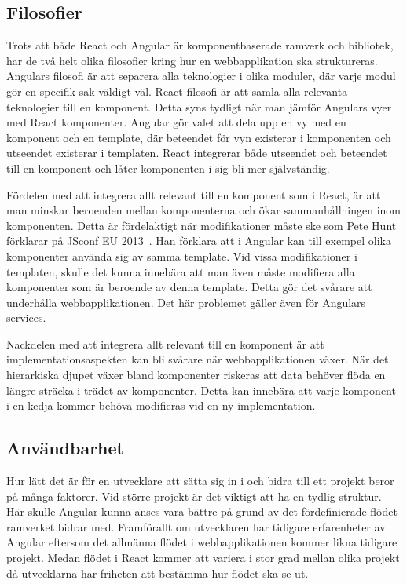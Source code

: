 \subsection{Filosofier}
Trots att både React och Angular är komponentbaserade ramverk och bibliotek, har de två helt olika filosofier kring hur en webbapplikation ska struktureras. Angulars filosofi är att separera alla teknologier i olika moduler, där varje modul gör en specifik sak väldigt väl. React filosofi är att samla alla relevanta teknologier till en komponent. Detta syns tydligt när man jämför Angulars vyer med React komponenter. Angular gör valet att dela upp en vy med en komponent och en template, där beteendet för vyn existerar i komponenten och utseendet existerar i templaten. React integrerar både utseendet och beteendet till en komponent och låter komponenten i sig bli mer självständig. 

Fördelen med att integrera allt relevant till en komponent som i React, är att man minskar beroenden mellan komponenterna och ökar sammanhållningen inom komponenten. Detta är fördelaktigt när modifikationer måste ske som Pete Hunt förklarar på JSconf EU 2013~\cite{JSConf}. Han förklara att i Angular kan till exempel olika komponenter använda sig av samma template. Vid vissa modifikationer i templaten, skulle det kunna innebära att man även måste modifiera alla komponenter som är beroende av denna template. Detta gör det svårare att underhålla webbapplikationen. Det här problemet gäller även för Angulars services.

Nackdelen med att integrera allt relevant till en komponent är att implementationsaspekten kan bli svårare när webbapplikationen växer. När det hierarkiska djupet växer bland komponenter riskeras att data behöver flöda en längre sträcka i trädet av komponenter. Detta kan innebära att varje komponent i en kedja kommer behöva modifieras vid en ny implementation.


\subsection{Användbarhet}
Hur lätt det är för en utvecklare att sätta sig in i och bidra till ett projekt beror på många faktorer. Vid större projekt är det viktigt att ha en tydlig struktur. Här skulle Angular kunna anses vara bättre på grund av det fördefinierade flödet ramverket bidrar med. Framförallt om utvecklaren har tidigare erfarenheter av Angular eftersom det allmänna flödet i webbapplikationen kommer likna tidigare projekt. Medan flödet i React kommer att variera i stor grad mellan olika projekt då utvecklarna har friheten att bestämma hur flödet ska se ut. 

